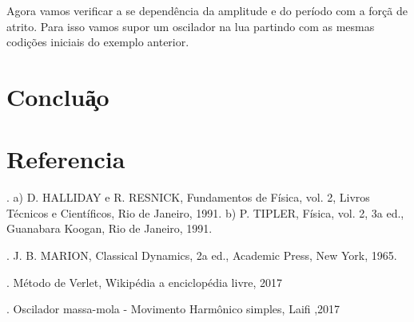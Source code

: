 \documentclass[a4paper]{article} %
\begin{document}
Agora vamos verificar a se depend\^encia da amplitude e do per\'iodo com a for\c{c}\~a de atrito. Para isso vamos supor um oscilador na lua partindo com as mesmas codi\c{c}\~oes iniciais do exemplo anterior.


 
\section{Conclu\c\c\~ao}

\section{Referencia}

\noindent 
{}. a) D. HALLIDAY e R. RESNICK, Fundamentos de F\'isica, vol. 2, Livros T\'ecnicos e Cient\'ificos, Rio de Janeiro, 1991. b) P. TIPLER, F\'isica, vol. 2, 3a ed., Guanabara Koogan, Rio de Janeiro, 1991.

. J. B. MARION, Classical Dynamics, 2a ed., Academic Press, New York, 1965.

. M\'etodo de Verlet, Wikip\'edia a enciclop\'edia livre, 2017

. Oscilador massa-mola - Movimento Harm\^{o}nico simples, Laifi ,2017
\end{document}
